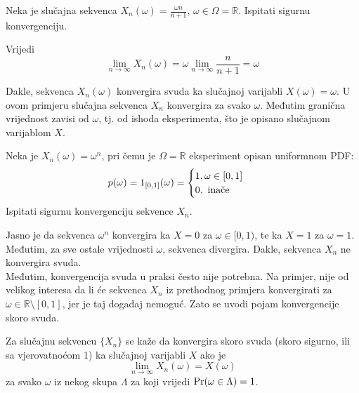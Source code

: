 \begin{exmp}
  Neka je slučajna sekvenca $X_n(\omega) = \frac{\omega n}{n+1}$, $\omega \in
  \Omega = \mathbb{R}$. Ispitati sigurnu konvergenciju.
\end{exmp}

Vrijedi
\begin{equation}
  \lim_{n\to\infty} X_n(\omega) = \omega \lim_{n\to\infty}\frac{n}{n+1} = \omega
\end{equation}

Dakle, sekvenca $X_n(\omega)$ konvergira svuda ka slučajnoj varijabli $X(\omega)
= \omega$. U ovom primjeru slučajna sekvenca $X_n$ konvergira za svako $\omega$.
Međutim granična vrijednost zavisi od $\omega$, tj. od ishoda eksperimenta, što
je opisano slučajnom varijablom $X$.

\begin{exmp} \label{ex:converge-surely}
  Neka je $X_n(\omega) = \omega^n$, pri čemu je $\Omega= \mathbb{R}$ eksperiment
  opisan uniformnom PDF:
  $$p(\omega) = 1_{[0,1]}(\omega) = \begin{cases}
      1, \omega \in [0,1]\ \\ 0,\ \text{\normalfont inače}
    \end{cases}
  $$
  Ispitati sigurnu konvergenciju sekvence $X_n$.
\end{exmp}

Jasno je da sekvenca $\omega^n$ konvergira ka $X=0$ za $\omega \in [0,1)$, te ka
$X=1$ za $\omega = 1$. Međutim, za sve ostale vrijednosti $\omega$, sekvenca
divergira. Dakle, sekvenca $X_n$ ne konvergira svuda.\\

Međutim, konvergencija svuda u praksi često nije potrebna. Na primjer, nije od
velikog interesa da li će sekvenca $X_n$ iz prethodnog primjera konvergirati za
$\omega \in \mathbb{R}\setminus[0,1]$, jer je taj događaj nemoguć. Zato se uvodi
pojam konvergencije skoro svuda.

\begin{definition}
  Za slučajnu sekvencu $\{X_n\}$ se kaže da konvergira skoro svuda (skoro
  sigurno, ili sa vjerovatnoćom 1) ka slučajnoj varijabli $X$ ako je
  \begin{equation}
    \lim_{n\to\infty} X_n(\omega) = X(\omega)
  \end{equation}
  za svako $\omega$ iz nekog skupa $\Lambda$ za koji vrijedi
  $\mathrm{Pr}(\omega\in\Lambda)=1$.
\end{definition}

